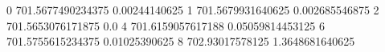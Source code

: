 0 701.5677490234375 0.00244140625
1 701.5679931640625 0.002685546875
2 701.5653076171875 0.0
4 701.6159057617188 0.05059814453125
6 701.5755615234375 0.01025390625
8 702.93017578125 1.3648681640625
